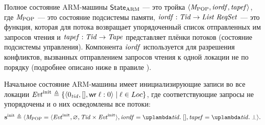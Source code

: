 Полное состояние ARM-машины $\mathsf{State}_{\text{ARM}}$ --- это тройка $\langle \mathit{M}_{\mathrm{POP}}, \mathit{iordf}, \mathit{tapef} \rangle$,
где $\mathit{M}_{\mathrm{POP}}$ --- это состояние подсистемы памяти,
$\mathit{iordf} : \mathit{Tid} \rightarrow \mathit{List}\;{\mathit{ReqSet}}$ --- это функция, которая
для потока возвращает упорядоченный список отправленных им запросов чтения и
$\mathit{tapef} : \mathit{Tid} \rightarrow \mathit{Tape}$ представляет плёнки потоков (состояние подсистемы управления).
Компонента $\mathit{iordf}$ используется для разрешения конфликтов, вызванных
отправлением запросов чтения к одной локации не по порядку
(подробнее описано ниже в правиле ).

Начальное состояние ARM-машины имеет инициализирующие записи во все локации
$\mathit{Evt}^{\rm init} \triangleq \{ \langle 0_{\mathit{tid}}, [], {\sf wr} \; \ell:0 \rangle \mid \ell \in Loc \}$,
где соответствующие запросы не упорядочены и о них осведомлены все потоки:
\[
\sinit \triangleq
  \angled{\Mpop = \angled{\Evt^{\rm init}, \emptyset, \Tid \times \Evt^{\rm init}},
          \IssuingOrderf = \lambda \tId. \; [],
          \tapef = \lambda \tId. \; \bot}.
\]

